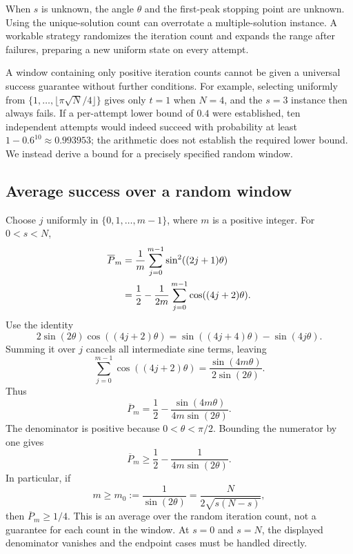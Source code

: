 \documentclass[11pt,oneside,openany]{book}
\theoremstyle{definition}
\begin{document}
When $s$ is unknown, the angle $\theta$ and the first-peak stopping point are unknown. Using the unique-solution count can overrotate a multiple-solution instance. A workable strategy randomizes the iteration count and expands the range after failures, preparing a new uniform state on every attempt.

A window containing only positive iteration counts cannot be given a universal success guarantee without further conditions. For example, selecting uniformly from $\{1,\ldots,\lfloor\pi\sqrt N/4\rfloor\}$ gives only $t=1$ when $N=4$, and the $s=3$ instance then always fails. If a per-attempt lower bound of $0.4$ were established, ten independent attempts would indeed succeed with probability at least $1-0.6^{10}\approx0.993953$; the arithmetic does not establish the required lower bound. We instead derive a bound for a precisely specified random window\cite{BBHT1998}.

\subsection{Average success over a random window}

Choose $j$ uniformly in $\{0,1,\ldots,m-1\}$, where $m$ is a positive integer. For $0<s<N$,
\begin{align}
 \overline P_m
 &=\frac1m\sum_{j=0}^{m-1}\sin^2((2j+1)\theta)\notag\\
 &=\frac12-\frac1{2m}\sum_{j=0}^{m-1}\cos((4j+2)\theta).
 \label{eq:search-average-start}
\end{align}
Use the identity
\begin{equation}
 2\sin(2\theta)\cos((4j+2)\theta)
 =\sin((4j+4)\theta)-\sin(4j\theta).
\end{equation}
Summing it over $j$ cancels all intermediate sine terms, leaving
\begin{equation}
 \sum_{j=0}^{m-1}\cos((4j+2)\theta)
 =\frac{\sin(4m\theta)}{2\sin(2\theta)}.
\end{equation}
Thus
\begin{equation}
 \overline P_m=\frac12-\frac{\sin(4m\theta)}{4m\sin(2\theta)}.
 \label{eq:search-average-probability}
\end{equation}
The denominator is positive because $0<\theta<\pi/2$. Bounding the numerator by one gives
\begin{equation}
 \overline P_m\geq\frac12-\frac1{4m\sin(2\theta)}.
\end{equation}
In particular, if
\begin{equation}
 m\geq m_0:=\frac1{\sin(2\theta)}
 =\frac{N}{2\sqrt{s(N-s)}},
 \label{eq:search-critical-window}
\end{equation}
then $\overline P_m\ge1/4$. This is an average over the random iteration count, not a guarantee for each count in the window. At $s=0$ and $s=N$, the displayed denominator vanishes and the endpoint cases must be handled directly.
\end{document}
